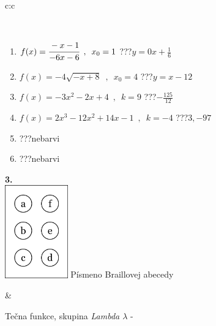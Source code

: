 \documentclass[10pt]{report}
\begin{document}
\begin{tabular}{c:c}
\begin{minipage}[c][104.5mm][t]{0.5\linewidth}
\begin{center}
\begin{minipage}{0.95\linewidth}
\begin{center}
\end{center}
\end{minipage}
\\[1mm]
\begin{minipage}{0.79\linewidth}
\begin{center}
\begin{varwidth}{\linewidth}
\begin{enumerate}
\small
\item $f(x)=\cfrac{-x-1}{-6x-6}\enspace , \enspace x_0=1$\quad \dotfill\; ???\;\dotfill \quad $y = 0x+\frac{1}{6}$
\item $f(x)=-4\sqrt{-x+8}\enspace , \enspace x_0=4$\quad \dotfill\; ???\;\dotfill \quad $y = x-12$
\item $f(x)=-3x^2-2x+4\enspace , \enspace k=9$\quad \dotfill\; ???\;\dotfill \quad $-\frac{125}{12}$
\item $f(x)=2x^3-12x^2+14x-1\enspace , \enspace k=-4$\quad \dotfill\; ???\;\dotfill \quad $3 , -97$
\item \quad \dotfill\; ???\;\dotfill \quad nebarvi
\item \quad \dotfill\; ???\;\dotfill \quad nebarvi
\end{enumerate}
\end{varwidth}
\end{center}
\end{minipage}
\begin{minipage}{0.20\linewidth}
\begin{center}
{\Huge\bfseries 3.} \\[2mm]
\includegraphics[height=40mm]{../images/braille.png}
{\small Písmeno Braillovej abecedy}
\end{center}
\end{minipage}
\end{center}
\end{minipage}
&
\begin{minipage}[c][104.5mm][t]{0.5\linewidth}
\begin{center}
\vspace{7mm}
{\huge Tečna funkce, skupina \textit{Lambda $\lambda$} -}\\[5mm]

\end{center}
\end{minipage}
\end{tabular}
\end{document}
